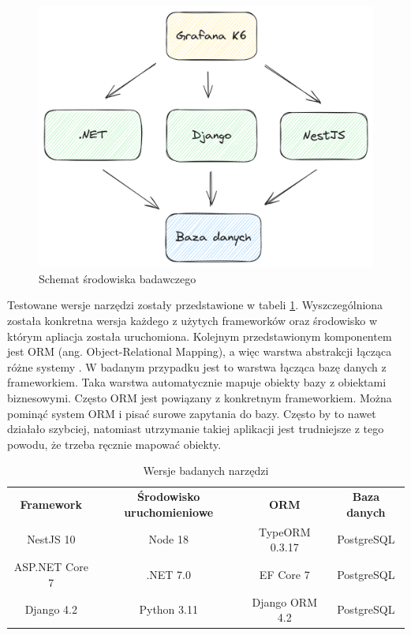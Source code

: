 \begin{figure}[!hb]
	\centering \includegraphics[width=1\linewidth]{rysunki/framework_benchmark_schema.png}
	\caption{Schemat środowiska badawczego}
	\label{rys:docker_schema}
\end{figure}



Testowane wersje narzędzi zostały przedstawione w tabeli \ref{table:version}.
Wyszczególniona została konkretna wersja każdego z użytych frameworków oraz środowisko w którym apliacja została uruchomiona.
Kolejnym przedstawionym komponentem jest ORM (ang. Object-Relational Mapping), a więc warstwa abstrakcji łącząca różne systemy \cite{5365905}.
W badanym przypadku jest to warstwa łącząca bazę danych z frameworkiem.
Taka warstwa automatycznie mapuje obiekty bazy z obiektami biznesowymi.
Często ORM jest powiązany z konkretnym frameworkiem.
Można pominąć system ORM i pisać surowe zapytania do bazy.
Często by to nawet działało szybciej, natomiast utrzymanie takiej aplikacji jest trudniejsze z tego powodu, że trzeba ręcznie mapować obiekty.

\begin{center}
	\begin{table}[h!]
	\begin{tabular}{ |c|c|c|c| } 
		\hline
		\textbf{Framework} & \textbf{Środowisko uruchomieniowe} & \textbf{ORM} & \textbf{Baza danych} \\ 
		NestJS 10 & Node 18 & TypeORM 0.3.17 & PostgreSQL \\
		ASP.NET Core 7 & .NET 7.0 & EF Core 7 & PostgreSQL \\ 
		Django 4.2 & Python 3.11 & Django ORM 4.2 & PostgreSQL \\
		\hline
	\end{tabular}
	\caption{Wersje badanych narzędzi}
	\label{table:version}
	\end{table}
\end{center}




